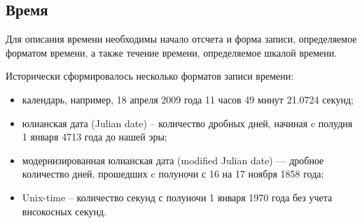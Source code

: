 \subsection{Время}
 Для описания времени необходимы начало отсчета и форма записи, определяемое форматом времени, 
 а также течение времени, определяемое шкалой времени.

Исторически сформировалось несколько форматов записи времени:
\begin{itemize}
    \item календарь, например, 18 апреля 2009 года 11 часов 49 минут
    21.0724 секунд;
    \item юлианская дата (Julian date) -- количество дробных дней, начиная c полудня 1 января
    4713 года до нашей эры;
    \item модернизированная юлианская дата (modified Julian date) —
    дробное количество дней, прошедших c полуночи с 16 на 17 ноября 1858 года;
    \item Unix-time -- количество секунд с полуночи 1 января 1970 года без
    учета високосных секунд.
\end{itemize}

